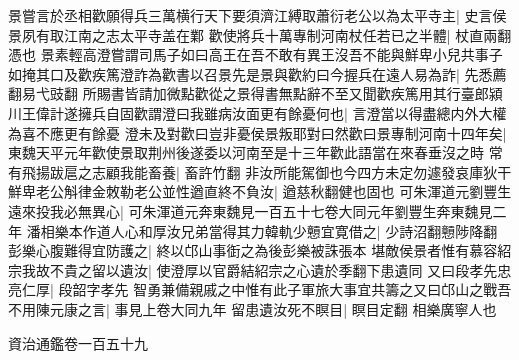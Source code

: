 景嘗言於丞相歡願得兵三萬横行天下要須濟江縛取蕭衍老公以為太平寺主|{
	史言侯景夙有取江南之志太平寺盖在鄴}
歡使將兵十萬專制河南杖任若已之半體|{
	杖直兩翻憑也}
景素輕高澄嘗謂司馬子如曰高王在吾不敢有異王沒吾不能與鮮卑小兒共事子如掩其口及歡疾篤澄詐為歡書以召景先是景與歡約曰今握兵在遠人易為詐|{
	先悉薦翻易弋豉翻}
所賜書皆請加微點歡從之景得書無點辭不至又聞歡疾篤用其行臺郎潁川王偉計遂擁兵自固歡謂澄曰我雖病汝面更有餘憂何也|{
	言澄當以得盡總内外大權為喜不應更有餘憂}
澄未及對歡曰豈非憂侯景叛耶對曰然歡曰景專制河南十四年矣|{
	東魏天平元年歡使景取荆州後遂委以河南至是十三年歡此語當在來春垂沒之時}
常有飛揚跋扈之志顧我能畜養|{
	畜許竹翻}
非汝所能駕御也今四方未定勿遽發哀庫狄干鮮卑老公斛律金敇勒老公並性遒直終不負汝|{
	遒慈秋翻健也固也}
可朱渾道元劉豐生遠來投我必無異心|{
	可朱渾道元奔東魏見一百五十七卷大同元年劉豐生奔東魏見二年}
潘相樂本作道人心和厚汝兄弟當得其力韓軌少戅宜寛借之|{
	少詩沼翻戅陟降翻}
彭樂心腹難得宜防護之|{
	終以邙山事衘之為後彭樂被誅張本}
堪敵侯景者惟有慕容紹宗我故不貴之留以遺汝|{
	使澄厚以官爵結紹宗之心遺於季翻下患遺同}
又曰段孝先忠亮仁厚|{
	段韶字孝先}
智勇兼備親戚之中惟有此子軍旅大事宜共籌之又曰邙山之戰吾不用陳元康之言|{
	事見上卷大同九年}
留患遺汝死不瞑目|{
	瞑目定翻}
相樂廣寧人也

資治通鑑卷一百五十九
